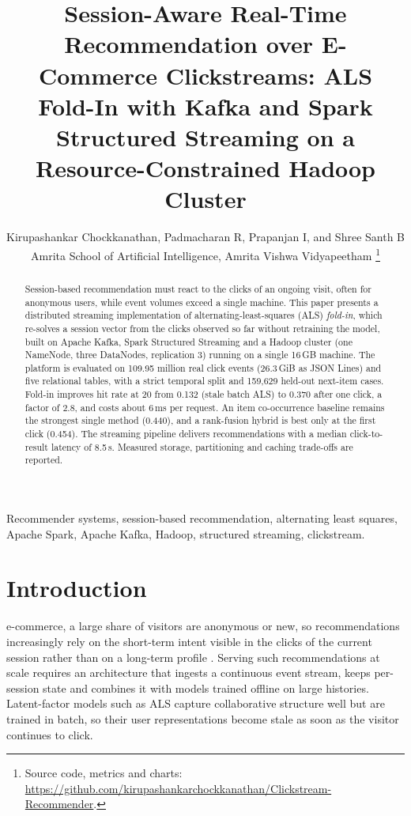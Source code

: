 \documentclass[10pt,journal]{IEEEtran}
\begin{document}
\title{Session-Aware Real-Time Recommendation over E-Commerce Clickstreams: ALS Fold-In with Kafka and Spark Structured Streaming on a Resource-Constrained Hadoop Cluster}

\author{Kirupashankar Chockkanathan, Padmacharan R, Prapanjan I, and Shree Santh B\\
Amrita School of Artificial Intelligence, Amrita Vishwa Vidyapeetham%
\thanks{Source code, metrics and charts: \protect\url{https://github.com/kirupashankarchockkanathan/Clickstream-Recommender}.}}

\maketitle

\begin{abstract}
Session-based recommendation must react to the clicks of an ongoing visit, often for anonymous users, while event volumes exceed a single machine. This paper presents a distributed streaming implementation of alternating-least-squares (ALS) \emph{fold-in}, which re-solves a session vector from the clicks observed so far without retraining the model, built on Apache Kafka, Spark Structured Streaming and a Hadoop cluster (one NameNode, three DataNodes, replication 3) running on a single 16\,GB machine. The platform is evaluated on 109.95 million real click events (26.3\,GiB as JSON Lines) and five relational tables, with a strict temporal split and 159{,}629 held-out next-item cases. Fold-in improves hit rate at 20 from 0.132 (stale batch ALS) to 0.370 after one click, a factor of 2.8, and costs about 6\,ms per request. An item co-occurrence baseline remains the strongest single method (0.440), and a rank-fusion hybrid is best only at the first click (0.454). The streaming pipeline delivers recommendations with a median click-to-result latency of 8.5\,s. Measured storage, partitioning and caching trade-offs are reported.
\end{abstract}

\begin{IEEEkeywords}
Recommender systems, session-based recommendation, alternating least squares, Apache Spark, Apache Kafka, Hadoop, structured streaming, clickstream.
\end{IEEEkeywords}

\section{Introduction}
 e-commerce, a large share of visitors are anonymous or new, so recommendations increasingly rely on the short-term intent visible in the clicks of the current session rather than on a long-term profile \cite{wang2021survey,ludewig2021}. Serving such recommendations at scale requires an architecture that ingests a continuous event stream, keeps per-session state and combines it with models trained offline on large histories. Latent-factor models such as ALS capture collaborative structure well but are trained in batch, so their user representations become stale as soon as the visitor continues to click.
\end{document}
